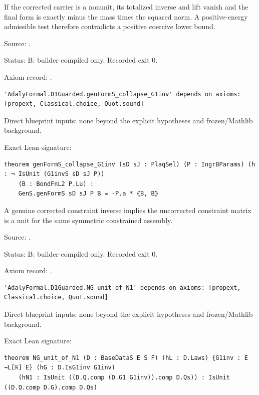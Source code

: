 \begin{theorem}[bp-241]
\label{bp-241}
\uses{}
\leanok
If the corrected carrier is a nonunit, its totalized inverse and lift vanish and the final form is exactly minus the mass times the squared norm. A positive-energy admissible test therefore contradicts a positive coercive lower bound.

\par Source: \texttt{}.
\par Status: B: builder-compiled only. Recorded exit 0.
\par Axiom record: \texttt{}.
\begin{verbatim}
'AdalyFormal.D1Guarded.genFormS_collapse_G1inv' depends on axioms: [propext, Classical.choice, Quot.sound]
\end{verbatim}
\par Direct blueprint inputs: none beyond the explicit hypotheses and frozen/Mathlib background.
\par Exact Lean signature:
\begin{verbatim}
theorem genFormS_collapse_G1inv (sD sJ : PlaqSel) (P : IngrBParams) (h : ¬ IsUnit (G1invS sD sJ P))
    (B : BondFnL2 P.Lu) :
    GenS.genFormS sD sJ P B = -P.a * ⟪B, B⟫
\end{verbatim}
\end{theorem}

\begin{theorem}[bp-242]
\label{bp-242}
\uses{}
\leanok
A genuine corrected constraint inverse implies the uncorrected constraint matrix is a unit for the same symmetric constrained assembly.

\par Source: \texttt{}.
\par Status: B: builder-compiled only. Recorded exit 0.
\par Axiom record: \texttt{}.
\begin{verbatim}
'AdalyFormal.D1Guarded.NG_unit_of_N1' depends on axioms: [propext, Classical.choice, Quot.sound]
\end{verbatim}
\par Direct blueprint inputs: none beyond the explicit hypotheses and frozen/Mathlib background.
\par Exact Lean signature:
\begin{verbatim}
theorem NG_unit_of_N1 (D : BaseDataS E S F) (hL : D.Laws) {G1inv : E →L[ℝ] E} (hG : D.IsG1inv G1inv)
    (hN1 : IsUnit ((D.Q.comp (D.G1 G1inv)).comp D.Qs)) : IsUnit ((D.Q.comp D.G).comp D.Qs)
\end{verbatim}
\end{theorem}

